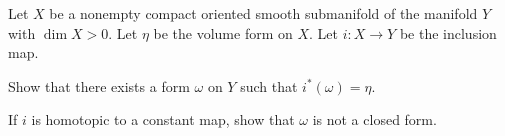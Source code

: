 Let $X$ be a nonempty compact oriented smooth submanifold of the
manifold $Y$ with $\dim X>0$. Let $\eta$ be the volume form on
$X$. Let $i:X\rightarrow Y$ be the inclusion map.
\begin{alist}
\item Show that there exists a form $\omega$ on $Y$ such that
$i^*(\omega)=\eta$.
\item If $i$ is homotopic to a constant map, show that $\omega$ is not
a closed form.
\end{alist}
